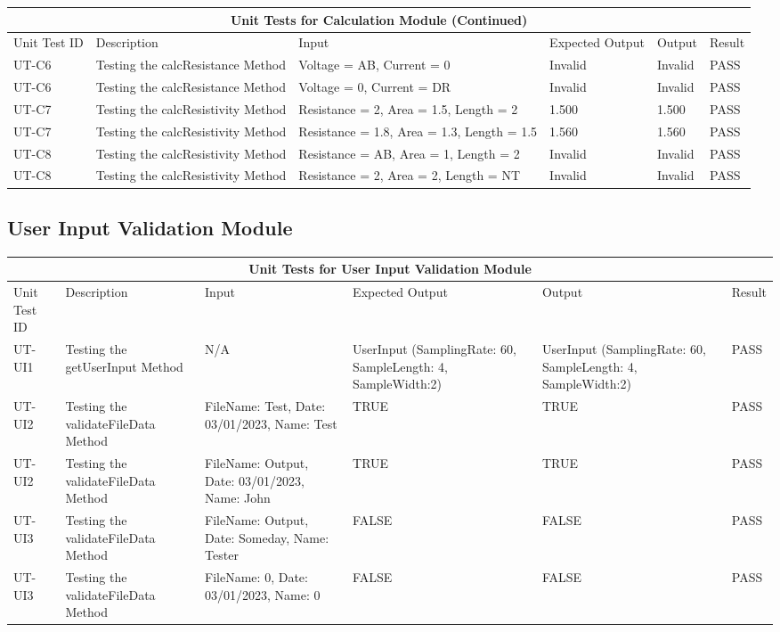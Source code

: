 \documentclass[12pt, titlepage]{article}
\begin{document}
 \pagebreak
 \begin{tabular}{ |p{1.5cm}||p{2.5cm}|p{3cm}|p{2cm}|p{2cm}|p{1.5cm}|}
  \hline
  \multicolumn{6}{|c|}{Unit Tests for Calculation Module (Continued)} \\
  \hline
  Unit Test ID & Description & Input & Expected Output & Output & Result\\
  \hline
  UT-C6  & Testing the calcResistance Method  &  Voltage = AB, Current = 0 & Invalid & Invalid & PASS \\
  \hline
  UT-C6  & Testing the calcResistance Method  &  Voltage = 0, Current = DR & Invalid & Invalid & PASS \\
  \hline
  UT-C7  & Testing the calcResistivity Method  &  Resistance = 2, Area = 1.5, Length = 2 & 1.500 & 1.500 & PASS \\
  \hline
  UT-C7  & Testing the calcResistivity Method  &  Resistance = 1.8, Area = 1.3, Length = 1.5  & 1.560 & 1.560 & PASS \\
  \hline
  UT-C8  & Testing the calcResistivity Method  &  Resistance = AB, Area = 1, Length = 2  & Invalid & Invalid & PASS \\
  \hline
  UT-C8  & Testing the calcResistivity Method  &  Resistance = 2, Area = 2, Length = NT  & Invalid & Invalid & PASS \\
  \hline
 \end{tabular}

 \subsection{User Input Validation Module}
 \begin{tabular}{ |p{1.5cm}||p{2cm}|p{2.5cm}|p{2cm}|p{2cm}|p{1.5cm}|}
  \hline
  \multicolumn{6}{|c|}{Unit Tests for User Input Validation Module} \\
  \hline
  Unit Test ID & Description & Input & Expected Output & Output & Result\\
  \hline
  UT-UI1   & Testing the getUserInput Method  &  N/A  & UserInput (SamplingRate: 60, SampleLength: 4, SampleWidth:2) & UserInput (SamplingRate: 60, SampleLength: 4, SampleWidth:2) & PASS \\
  \hline
  UT-UI2   & Testing the validateFileData Method  &  FileName: Test, Date: 03/01/2023, Name: Test & TRUE & TRUE & PASS \\
  \hline
  UT-UI2   & Testing the validateFileData Method  &  FileName: Output, Date: 03/01/2023, Name: John & TRUE & TRUE & PASS \\
  \hline
  UT-UI3   & Testing the validateFileData Method  &  FileName: Output, Date: Someday, Name: Tester & FALSE & FALSE & PASS \\
  \hline
  UT-UI3   & Testing the validateFileData Method  &  FileName: 0, Date: 03/01/2023, Name: 0 & FALSE & FALSE & PASS \\
  \hline
 \end{tabular}
\end{document}
